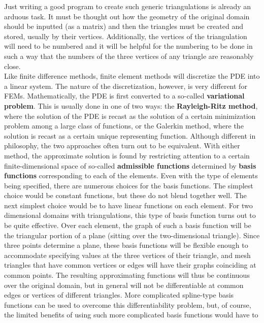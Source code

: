 \documentclass[../main.tex]{subfiles}
\begin{document}
Just writing a good program to create such generic triangulations is already an arduous task. It must be thought out how the geometry of the original domain should be inputted (as a matrix) and then the triangles must be created and stored, usually by their vertices. Additionally, the vertices of the triangulation will need to be numbered and it will be helpful for the numbering to be done in such a way that the numbers of the three vertices of any triangle are reasonably close. 
\\

Like finite difference methods, finite element methods will discretize the PDE 
into a linear system. The nature of the discretization, however, is very different 
for FEMs. Mathematically, the PDE is first converted to a so-called \textbf{variational 
problem}. This is usually done in one of two ways: the \textbf{Rayleigh-Ritz method}, 
where the solution of the PDE is recast as the solution of a certain minimization 
problem among a large class of functions, or the Galerkin method, where the 
solution is recast as a certain unique representing function. Although different in 
philosophy, the two approaches often turn out to be equivalent. With either 
method, the approximate solution is found by restricting attention to a certain 
finite-dimensional space of so-called \textbf{admissible functions} determined by \textbf{basis 
functions} corresponding to each of the elements. Even with the type of elements 
being specified, there are numerous choices for the basis functions. The simplest 
choice would be constant functions, but these do not blend together well. The next 
simplest choice would be to have linear functions on each element. For two dimensional domains with triangulations, this type of basis function turns out to be 
quite effective. Over each element, the graph of such a basis function will be the 
triangular portion of a plane (sitting over the two-dimensional triangle). Since 
three points determine a plane, these basis functions will be flexible enough to 
accommodate specifying values at the three vertices of their triangle, and mesh 
triangles that have common vertices or edges will have their graphs coinciding at 
common points. The resulting approximating functions will thus be continuous 
over the original domain, but in general will not be differentiable at common 
edges or vertices of different triangles. More complicated spline-type basis 
functions can be used to overcome this differentiability problem, but, of course, 
the limited benefits of using such more complicated basis functions would have to 
\end{document}
